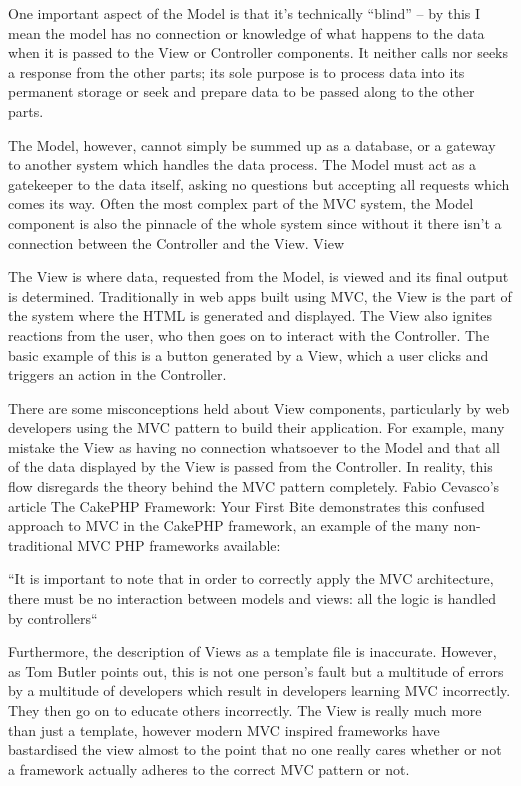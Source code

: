 \documentclass[a4paper,openany,twoside,draft]{book}
\begin{document}
One important aspect of the Model is that it’s technically “blind” – by this I mean the model has no connection or knowledge of what happens to the data when it is passed to the View or Controller components. It neither calls nor seeks a response from the other parts; its sole purpose is to process data into its permanent storage or seek and prepare data to be passed along to the other parts.

The Model, however, cannot simply be summed up as a database, or a gateway to another system which handles the data process. The Model must act as a gatekeeper to the data itself, asking no questions but accepting all requests which comes its way. Often the most complex part of the MVC system, the Model component is also the pinnacle of the whole system since without it there isn’t a connection between the Controller and the View.
View

The View is where data, requested from the Model, is viewed and its final output is determined. Traditionally in web apps built using MVC, the View is the part of the system where the HTML is generated and displayed. The View also ignites reactions from the user, who then goes on to interact with the Controller. The basic example of this is a button generated by a View, which a user clicks and triggers an action in the Controller.

There are some misconceptions held about View components, particularly by web developers using the MVC pattern to build their application. For example, many mistake the View as having no connection whatsoever to the Model and that all of the data displayed by the View is passed from the Controller. In reality, this flow disregards the theory behind the MVC pattern completely. Fabio Cevasco’s article The CakePHP Framework: Your First Bite demonstrates this confused approach to MVC in the CakePHP framework, an example of the many non-traditional MVC PHP frameworks available:

    “It is important to note that in order to correctly apply the MVC architecture, there must be no interaction between models and views: all the logic is handled by controllers“

Furthermore, the description of Views as a template file is inaccurate. However, as Tom Butler points out, this is not one person’s fault but a multitude of errors by a multitude of developers which result in developers learning MVC incorrectly. They then go on to educate others incorrectly. The View is really much more than just a template, however modern MVC inspired frameworks have bastardised the view almost to the point that no one really cares whether or not a framework actually adheres to the correct MVC pattern or not.
\end{document}
